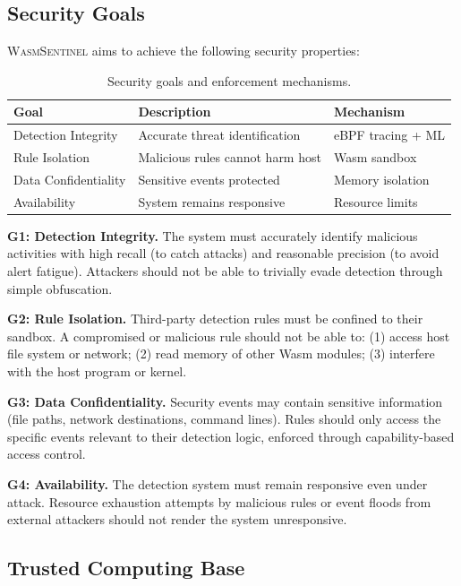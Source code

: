 \subsection{Security Goals}

\textsc{WasmSentinel} aims to achieve the following security properties:

\begin{table}[t]
\centering
\caption{Security goals and enforcement mechanisms.}
\label{tab:security-goals}
\begin{tabular}{p{2.2cm}p{2.8cm}p{2.2cm}}
\toprule
\textbf{Goal} & \textbf{Description} & \textbf{Mechanism} \\
\midrule
Detection Integrity & Accurate threat identification & eBPF tracing + ML \\
Rule Isolation & Malicious rules cannot harm host & Wasm sandbox \\
Data Confidentiality & Sensitive events protected & Memory isolation \\
Availability & System remains responsive & Resource limits \\
\bottomrule
\end{tabular}
\end{table}

\textbf{G1: Detection Integrity.}
The system must accurately identify malicious activities with high recall (to catch attacks) and reasonable precision (to avoid alert fatigue).
Attackers should not be able to trivially evade detection through simple obfuscation.

\textbf{G2: Rule Isolation.}
Third-party detection rules must be confined to their sandbox.
A compromised or malicious rule should not be able to:
(1) access host file system or network;
(2) read memory of other Wasm modules;
(3) interfere with the host program or kernel.

\textbf{G3: Data Confidentiality.}
Security events may contain sensitive information (file paths, network destinations, command lines).
Rules should only access the specific events relevant to their detection logic, enforced through capability-based access control.

\textbf{G4: Availability.}
The detection system must remain responsive even under attack.
Resource exhaustion attempts by malicious rules or event floods from external attackers should not render the system unresponsive.

\subsection{Trusted Computing Base}

